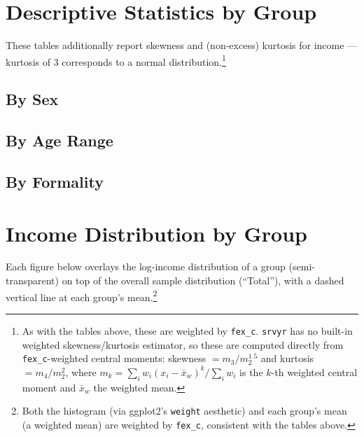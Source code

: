 \documentclass[11pt]{article}
\begin{document}
\section{Descriptive Statistics by Group}

These tables additionally report skewness and (non-excess) kurtosis for
income --- kurtosis of 3 corresponds to a normal distribution.\footnote{As with
the tables above, these are weighted by \texttt{fex\_c}. \texttt{srvyr} has no
built-in weighted skewness/kurtosis estimator, so these are computed directly
from \texttt{fex\_c}-weighted central moments: skewness $= m_3 / m_2^{1.5}$ and
kurtosis $= m_4 / m_2^2$, where $m_k = \sum_i w_i (x_i - \bar{x}_w)^k \big/
\sum_i w_i$ is the $k$-th weighted central moment and $\bar{x}_w$ the
weighted mean.}

\subsection{By Sex}





\subsection{By Age Range}





\subsection{By Formality}





\section{Income Distribution by Group}

Each figure below overlays the log-income distribution of a group (semi-transparent)
on top of the overall sample distribution (``Total''), with a dashed vertical line at
each group's mean.\footnote{Both the histogram (via ggplot2's \texttt{weight}
aesthetic) and each group's mean (a weighted mean) are weighted by
\texttt{fex\_c}, consistent with the tables above.}
\end{document}
